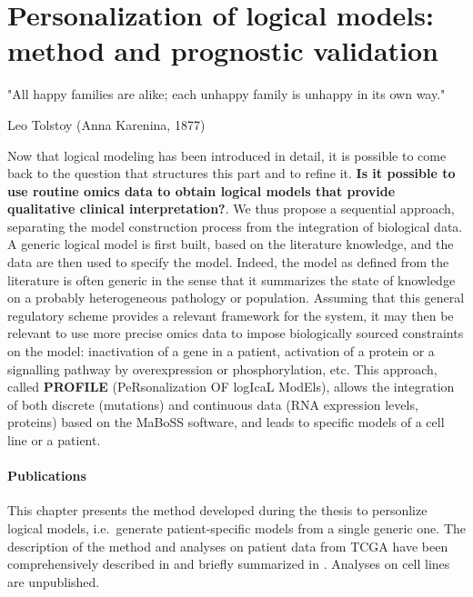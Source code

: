 \documentclass[a4paper,12pt,twoside,onecolumn,openright,final,oldfontcommands]{memoir}
\newcommand{\initial}[1]{
	\lettrine[lines=3,lhang=0.33,nindent=0em]{
		\color{gray}
     		{\textsc{#1}}}{}}
\let\BeginKnitrBlock\begin \let\EndKnitrBlock\end
\begin{document}
\chapter{Personalization of logical models: method and prognostic
validation}\label{personalization-of-logical-models-method-and-prognostic-validation}

\epigraph{"All happy families are alike; each unhappy family is unhappy in its own way."}{Leo Tolstoy (Anna Karenina, 1877)}

\initial{N}ow that logical modeling has been introduced in detail, it is
possible to come back to the question that structures this part and to
refine it. \textbf{Is it possible to use routine omics data to obtain
logical models that provide qualitative clinical interpretation?}. We
thus propose a sequential approach, separating the model construction
process from the integration of biological data. A generic logical model
is first built, based on the literature knowledge, and the data are then
used to specify the model. Indeed, the model as defined from the
literature is often generic in the sense that it summarizes the state of
knowledge on a probably heterogeneous pathology or population. Assuming
that this general regulatory scheme provides a relevant framework for
the system, it may then be relevant to use more precise omics data to
impose biologically sourced constraints on the model: inactivation of a
gene in a patient, activation of a protein or a signalling pathway by
overexpression or phosphorylation, etc. This approach, called
\textbf{PROFILE} (PeRsonalization OF logIcaL ModEls), allows the
integration of both discrete (mutations) and continuous data (RNA
expression levels, proteins) based on the MaBoSS software, and leads to
specific models of a cell line or a patient.

\BeginKnitrBlock{summarybox}
\subsubsection*{Publications}\label{publications-1}

This chapter presents the method developed during the thesis to
personlize logical models, i.e.~generate patient-specific models from a
single generic one. The description of the method and analyses on
patient data from TCGA have been comprehensively described in
\citet{beal2019personalization} and briefly summarized in
\citet{beal2020personalized}. Analyses on cell lines are unpublished.
\EndKnitrBlock{summarybox}
\end{document}
